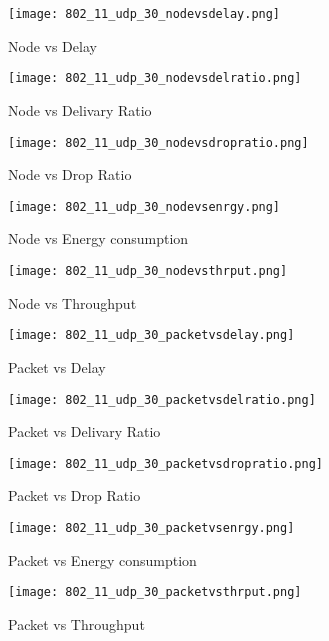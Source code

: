 \documentclass{report}
\begin{document}
\begin{figure}
  \caption{Node vs Delay}
  \centering
    \texttt{[image: 802\_11\_udp\_30\_nodevsdelay.png]}
\end{figure}
\begin{figure}
  \caption{Node vs Delivary Ratio}
  \centering
    \texttt{[image: 802\_11\_udp\_30\_nodevsdelratio.png]}
\end{figure}
\begin{figure}
  \caption{Node vs Drop Ratio}
  \centering
    \texttt{[image: 802\_11\_udp\_30\_nodevsdropratio.png]}
\end{figure}
\begin{figure}
  \caption{Node vs Energy consumption}
  \centering
    \texttt{[image: 802\_11\_udp\_30\_nodevsenrgy.png]}
\end{figure}
\begin{figure}
  \caption{Node vs Throughput}
  \centering
    \texttt{[image: 802\_11\_udp\_30\_nodevsthrput.png]}
\end{figure}

\begin{figure}
  \caption{Packet vs Delay}
  \centering
    \texttt{[image: 802\_11\_udp\_30\_packetvsdelay.png]}
\end{figure}
\begin{figure}
  \caption{Packet vs Delivary Ratio}
  \centering
    \texttt{[image: 802\_11\_udp\_30\_packetvsdelratio.png]}
\end{figure}
\begin{figure}
  \caption{Packet vs Drop Ratio}
  \centering
    \texttt{[image: 802\_11\_udp\_30\_packetvsdropratio.png]}
\end{figure}
\begin{figure}
  \caption{Packet vs Energy consumption}
  \centering
    \texttt{[image: 802\_11\_udp\_30\_packetvsenrgy.png]}
\end{figure}
\begin{figure}
  \caption{Packet vs Throughput}
  \centering
    \texttt{[image: 802\_11\_udp\_30\_packetvsthrput.png]}
\end{figure}
\end{document}
